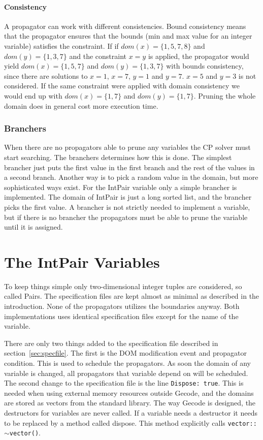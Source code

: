 \documentclass[a4paper,11pt]{article}
\begin{document}
\paragraph{Consistency}
A propagator can work with different consistencies. Bound consistency means that the propagator ensures that the bounds (min and max value for an integer variable) satisfies the constraint. If if $dom(x)=\{1,5,7,8\}$ and $dom(y)=\{1,3,7\}$ and the constraint $x=y$ is applied, the propagator would yield $dom(x)=\{1,5,7\}$ and $dom(y)=\{1,3,7\}$ with bounds consistency, since there are solutions to $x=1$, $x=7$, $y=1$ and $y=7$. $x=5$ and $y=3$ is not considered. If the same constraint were applied with domain consistency we would end up with $dom(x)=\{1,7\}$ and $dom(y)=\{1,7\}$. Pruning the whole domain does in general cost more execution time.

\subsubsection{Branchers}
When there are no propagators able to prune any variables the CP solver must start searching. The branchers determines how this is done. The simplest brancher just puts the first value in the first branch and the rest of the values in a second branch. Another way is to pick a random value in the domain, but more sophisticated ways exist. For the IntPair variable only a simple brancher is implemented. The domain of IntPair is just a long sorted list, and the brancher picks the first value. A brancher is not strictly needed to implement a variable, but if there is no brancher the propagators must be able to prune the variable until it is assigned. 

\section{The IntPair Variables}
To keep things simple only two-dimensional integer tuples are considered, so called Pairs. The specification files are kept almost as minimal as described in the introduction. None of the propagators utilizes the boundaries anyway. Both implementations uses identical specification files except for the name of the variable. 

There are only two things added to the specification file described in section~\ref{sec:specfile}. The first is the DOM modification event and propagator condition. This is used to schedule the propagators. As soon the domain of any variable is changed, all propagators that variable depend on will be scheduled. The second change to the specification file is the line \texttt{Dispose: true}. This is needed when using external memory resources outside Gecode, and the domains are stored as vectors from the standard library. The way Gecode is designed, the destructors for variables are never called. If a variable needs a destructor it needs to be replaced by a method called dispose. This method explicitly calls \texttt{vector::$\sim$vector()}.
\end{document}
